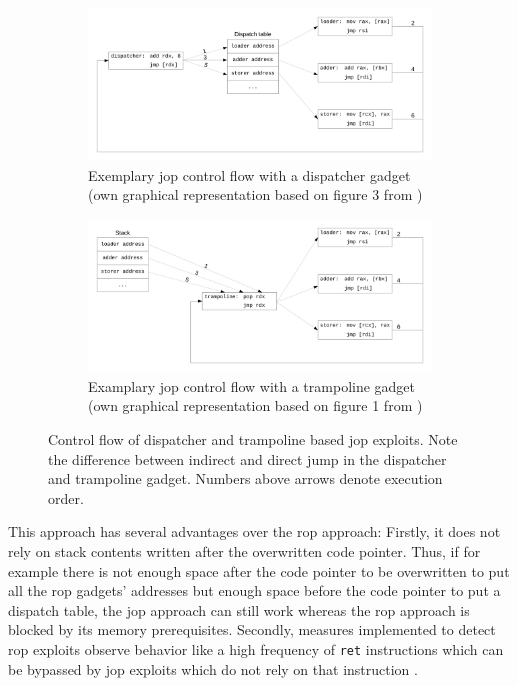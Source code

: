 \begin{figure}[htb]
	\centering
	\begin{subfigure}[t]{0.8\textwidth}
		\centering
		\includegraphics[width=\textwidth]{figures/jop-dispatcher}
		\caption{Exemplary \acs{jop} control flow with a dispatcher gadget (own graphical representation based on figure 3 from \cite{Bletsch2011})}
		\label{fig:jop-dispatcher}
		\vspace*{1em}
	\end{subfigure}
	\begin{subfigure}[t]{0.8\textwidth}
		\centering
		\includegraphics[width=\textwidth]{figures/jop-trampoline}
		\caption{Examplary \acs{jop} control flow with a trampoline gadget (own graphical representation based on figure 1 from \cite{Checkoway2010})}
		\label{fig:jop-trampoline}
	\end{subfigure}
	\caption{Control flow of dispatcher and trampoline based \acs{jop} exploits. Note the difference between indirect and direct jump in the dispatcher and trampoline gadget. Numbers above arrows denote execution order.}
	\label{fig:jump-oriented-programming}
\end{figure}

This approach has several advantages over the \gls{rop} approach:
Firstly, it does not rely on stack contents written after the overwritten code pointer.
Thus, if for example there is not enough space after the code pointer to be overwritten to put all the \gls{rop} gadgets' addresses but enough space before the code pointer to put a dispatch table, the \gls{jop} approach can still work whereas the \gls{rop} approach is blocked by its memory prerequisites.
Secondly, measures implemented to detect \gls{rop} exploits observe behavior like a high frequency of \texttt{ret} instructions which can be bypassed by \gls{jop} exploits which do not rely on that instruction \cite{Bletsch2011}.

